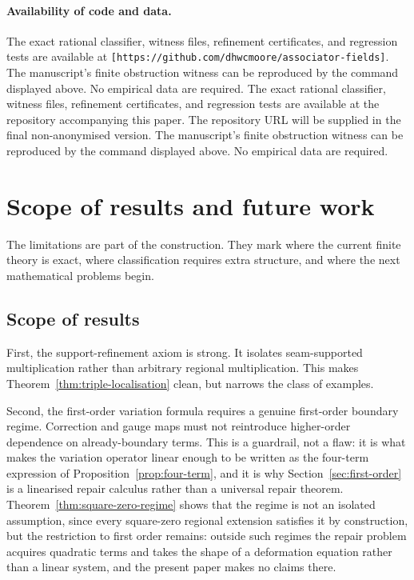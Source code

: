 \documentclass[11pt]{article}
\begin{document}
\paragraph{Availability of code and data.}
The exact rational classifier, witness files, refinement certificates, and regression tests are available at \texttt{[https://github.com/dhwcmoore/associator-fields]}. The manuscript's finite obstruction witness can be reproduced by the command displayed above. No empirical data are required.
The exact rational classifier, witness files, refinement certificates, and regression tests are available at the repository accompanying this paper. The repository URL will be supplied in the final non-anonymised version. The manuscript's finite obstruction witness can be reproduced by the command displayed above. No empirical data are required.

\section{Scope of results and future work}
\label{sec:scope-future}

The limitations are part of the construction. They mark where the current finite theory is exact, where classification requires extra structure, and where the next mathematical problems begin.

\subsection{Scope of results}

First, the support-refinement axiom is strong. It isolates seam-supported multiplication rather than arbitrary regional multiplication. This makes Theorem~\ref{thm:triple-localisation} clean, but narrows the class of examples.

Second, the first-order variation formula requires a genuine first-order boundary regime. Correction and gauge maps must not reintroduce higher-order dependence on already-boundary terms. This is a guardrail, not a flaw: it is what makes the variation operator linear enough to be written as the four-term expression of Proposition~\ref{prop:four-term}, and it is why Section~\ref{sec:first-order} is a linearised repair calculus rather than a universal repair theorem. Theorem~\ref{thm:square-zero-regime} shows that the regime is not an isolated assumption, since every square-zero regional extension satisfies it by construction, but the restriction to first order remains: outside such regimes the repair problem acquires quadratic terms and takes the shape of a deformation equation rather than a linear system, and the present paper makes no claims there.
\end{document}
